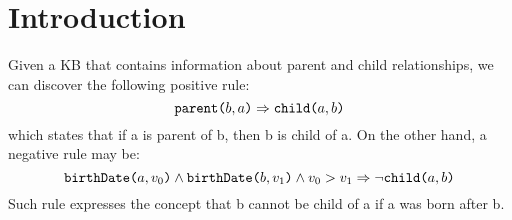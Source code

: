 \section{Introduction}
\begin{myExample}\label{ex:intro}
	Given a KB that contains information about parent and child relationships, we can discover the following positive rule:
	\emph{$$ \texttt{parent(}b,a\texttt{)} \Rightarrow \texttt{child(}a,b\texttt{)} $$}which states that if a is parent of b, then b is child of a.
	On the other hand, a negative rule may be:
	\emph{$$ \texttt{birthDate(}a,v_0\texttt{)} \wedge \texttt{birthDate(}b,v_1\texttt{)} \wedge v_0 > v_1 \Rightarrow \neg \texttt{child(}a,b\texttt{)} $$}Such rule expresses the concept that b cannot be child of a if a was born after b.
\end{myExample}